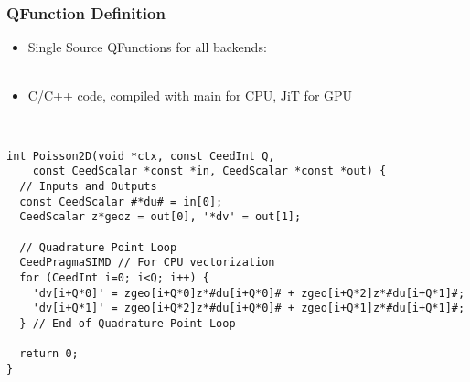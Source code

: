 \documentclass{beamer}
\begin{document}
\begin{frame}[fragile]
\begin{center}
\frametitle{QFunction Definition}

\begin{itemize}

\item Single Source QFunctions for all backends:\\

~\\

\item C/C++ code, compiled with main for CPU, JiT for GPU\\

\end{itemize}

~\\

{\scriptsize
\begin{lstlisting}[style=qfunc]
int Poisson2D(void *ctx, const CeedInt Q,
    const CeedScalar *const *in, CeedScalar *const *out) {
  // Inputs and Outputs
  const CeedScalar #*du# = in[0];
  CeedScalar z*geoz = out[0], '*dv' = out[1];

  // Quadrature Point Loop
  CeedPragmaSIMD // For CPU vectorization
  for (CeedInt i=0; i<Q; i++) {
    'dv[i+Q*0]' = zgeo[i+Q*0]z*#du[i+Q*0]# + zgeo[i+Q*2]z*#du[i+Q*1]#;
    'dv[i+Q*1]' = zgeo[i+Q*2]z*#du[i+Q*0]# + zgeo[i+Q*1]z*#du[i+Q*1]#;
  } // End of Quadrature Point Loop

  return 0;
}
\end{lstlisting}
}

\end{center}
\end{frame}

\end{document}
